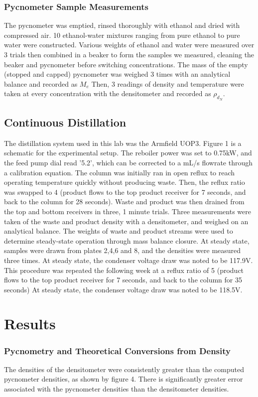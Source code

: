 \documentclass[lettersize,journal]{IEEEtran}
\begin{document}
	\subsubsection{Pycnometer Sample Measurements}
	The pycnometer was emptied, rinsed thoroughly with ethanol and dried with compressed air. 10 ethanol-water mixtures ranging from pure ethanol to pure water were constructed. Various weights of ethanol and water were measured over 3 trials then combined in a beaker to form the samples we measured, cleaning the beaker and pycnometer before switching concentrations. The mass of the empty (stopped and capped) pycnometer was weighed 3 times with an analytical balance and recorded as $M_{e}$ Then, 3 readings of density and temperature were taken at every concentration with the densitometer and recorded as $\rho_{d_N}$.
	\subsection{Continuous Distillation}
	The distillation system used in this lab was the Armfield UOP3. Figure 1 is a schematic for the experimental setup. The reboiler power was set to 0.75kW, and the feed pump dial read '5.2', which can be corrected to a mL/s flowrate through a calibration equation. The column was initially ran in open reflux to reach operating temperature quickly without producing waste. Then, the reflux ratio was swapped to 4 (product flows to the top product receiver for 7 seconds, and back to the column for 28 seconds).  Waste and product was then drained from the top and bottom receivers in three, 1 minute trials. Three measurements were taken of the waste and product density with a densitometer, and weighed on an analytical balance. The weights of  waste and product streams were used to determine steady-state operation through mass balance closure. At steady state, samples were drawn from plates 2,4,6 and 8, and the densities were measured three times. At steady state, the condenser voltage draw was noted to be 117.9V.
	This procedure was repeated the following week at a reflux ratio of 5 (product flows to the top product receiver for 7 seconds, and back to the column for 35 seconds) At steady state, the condenser voltage draw was noted to be 118.5V.
	\section{Results}
	\subsubsection{Pycnometry and Theoretical Conversions from Density}
	The densities of the densitometer were consistently greater than the computed pycnometer densities, as shown by figure 4. There is significantly greater error associated with the pycnometer densities than the densitometer densities.
	
\end{document}
